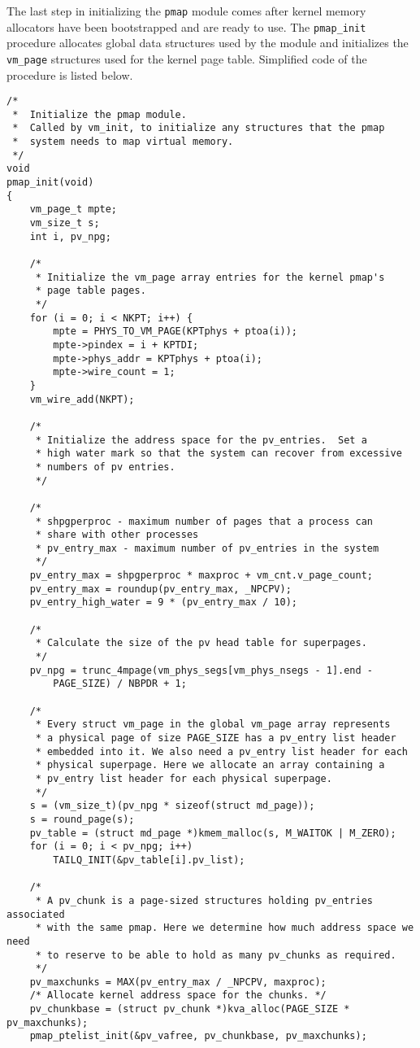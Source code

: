 \documentclass[shortabstract, english]{iithesis}
\newenvironment{code}{}{}
\begin{document}
The last step in initializing the \texttt{pmap} module comes after kernel memory
allocators have been bootstrapped and are ready to use. The
\texttt{pmap_init} procedure allocates global data structures used by the
module and initializes the \texttt{vm_page} structures used for the
kernel page table. Simplified code of the procedure is listed below.

\begin{code}
\begin{verbatim}
/*
 *  Initialize the pmap module.
 *  Called by vm_init, to initialize any structures that the pmap
 *  system needs to map virtual memory.
 */
void
pmap_init(void)
{
    vm_page_t mpte;
    vm_size_t s;
    int i, pv_npg;

    /*
     * Initialize the vm_page array entries for the kernel pmap's
     * page table pages.
     */
    for (i = 0; i < NKPT; i++) {
        mpte = PHYS_TO_VM_PAGE(KPTphys + ptoa(i));
        mpte->pindex = i + KPTDI;
        mpte->phys_addr = KPTphys + ptoa(i);
        mpte->wire_count = 1;
    }
    vm_wire_add(NKPT);

    /*
     * Initialize the address space for the pv_entries.  Set a
     * high water mark so that the system can recover from excessive
     * numbers of pv entries.
     */

    /*
     * shpgperproc - maximum number of pages that a process can
     * share with other processes
     * pv_entry_max - maximum number of pv_entries in the system
     */
    pv_entry_max = shpgperproc * maxproc + vm_cnt.v_page_count;
    pv_entry_max = roundup(pv_entry_max, _NPCPV);
    pv_entry_high_water = 9 * (pv_entry_max / 10);

    /*
     * Calculate the size of the pv head table for superpages.
     */
    pv_npg = trunc_4mpage(vm_phys_segs[vm_phys_nsegs - 1].end -
        PAGE_SIZE) / NBPDR + 1;

    /*
     * Every struct vm_page in the global vm_page array represents
     * a physical page of size PAGE_SIZE has a pv_entry list header
     * embedded into it. We also need a pv_entry list header for each
     * physical superpage. Here we allocate an array containing a
     * pv_entry list header for each physical superpage.
     */
    s = (vm_size_t)(pv_npg * sizeof(struct md_page));
    s = round_page(s);
    pv_table = (struct md_page *)kmem_malloc(s, M_WAITOK | M_ZERO);
    for (i = 0; i < pv_npg; i++)
        TAILQ_INIT(&pv_table[i].pv_list);

    /*
     * A pv_chunk is a page-sized structures holding pv_entries associated
     * with the same pmap. Here we determine how much address space we need
     * to reserve to be able to hold as many pv_chunks as required.
     */
    pv_maxchunks = MAX(pv_entry_max / _NPCPV, maxproc);
    /* Allocate kernel address space for the chunks. */
    pv_chunkbase = (struct pv_chunk *)kva_alloc(PAGE_SIZE * pv_maxchunks);
    pmap_ptelist_init(&pv_vafree, pv_chunkbase, pv_maxchunks);


\end{verbatim}
\end{code}
\end{document}
